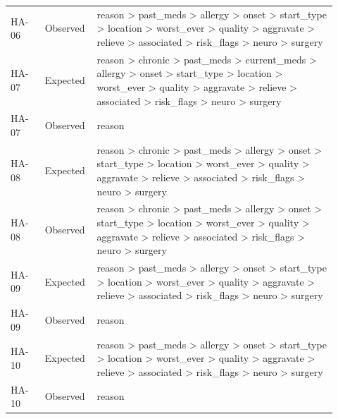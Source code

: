 \begin{longtable}{>{\raggedright\arraybackslash}p{0.1\linewidth}>{\raggedright\arraybackslash}p{0.12\linewidth}>{\raggedright\arraybackslash}p{0.7\linewidth}}
HA-\allowbreak{}06 & Observed & reason > past\_\allowbreak{}meds > allergy > onset > start\_\allowbreak{}type > location > worst\_\allowbreak{}ever > quality > aggravate > relieve > associated > risk\_\allowbreak{}flags > neuro > surgery \\
HA-\allowbreak{}07 & Expected & reason > chronic > past\_\allowbreak{}meds > current\_\allowbreak{}meds > allergy > onset > start\_\allowbreak{}type > location > worst\_\allowbreak{}ever > quality > aggravate > relieve > associated > risk\_\allowbreak{}flags > neuro > surgery \\
HA-\allowbreak{}07 & Observed & reason \\
HA-\allowbreak{}08 & Expected & reason > chronic > past\_\allowbreak{}meds > allergy > onset > start\_\allowbreak{}type > location > worst\_\allowbreak{}ever > quality > aggravate > relieve > associated > risk\_\allowbreak{}flags > neuro > surgery \\
HA-\allowbreak{}08 & Observed & reason > chronic > past\_\allowbreak{}meds > allergy > onset > start\_\allowbreak{}type > location > worst\_\allowbreak{}ever > quality > aggravate > relieve > associated > risk\_\allowbreak{}flags > neuro > surgery \\
HA-\allowbreak{}09 & Expected & reason > past\_\allowbreak{}meds > allergy > onset > start\_\allowbreak{}type > location > worst\_\allowbreak{}ever > quality > aggravate > relieve > associated > risk\_\allowbreak{}flags > neuro > surgery \\
HA-\allowbreak{}09 & Observed & reason \\
HA-\allowbreak{}10 & Expected & reason > past\_\allowbreak{}meds > allergy > onset > start\_\allowbreak{}type > location > worst\_\allowbreak{}ever > quality > aggravate > relieve > associated > risk\_\allowbreak{}flags > neuro > surgery \\
HA-\allowbreak{}10 & Observed & reason \\
\end{longtable}\endgroup
